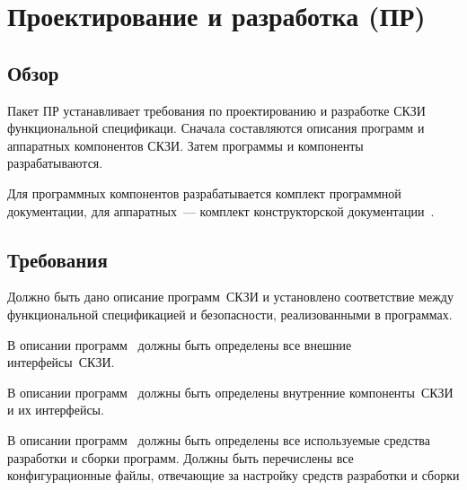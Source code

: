 \section{Проектирование и разработка (ПР)}\label{DI}

\subsection{Обзор}\label{DI.Intro}

Пакет ПР устанавливает требования по проектированию и разработке 
 СКЗИ
 функциональной спецификаци.
%
Сначала составляются описания программ и аппаратных компонентов СКЗИ.
Затем программы и компоненты разрабатываются.

Для программных компонентов разрабатывается комплект программной 
документации, для аппаратных~--- комплект конструкторской 
документации~.


\subsection{Требования}\label{DI.Reqs}

\label{R.DI.ProgSpec}
Должно быть дано описание программ~СКЗИ и установлено соответствие 
между функциональной спецификацией и  безопасности,
реализованными в программах.


\label{R.DI.HLD}
В описании программ~
должны быть определены все внешние интерфейсы~СКЗИ.

\label{R.DI.LLD}
В описании программ~
должны быть определены внутренние компоненты~СКЗИ и их интерфейсы.

\label{R.DI.Tools}
В описании программ~ должны быть определены все
используемые средства разработки и сборки программ. Должны быть перечислены 
все конфигурационные файлы, отвечающие за настройку средств разработки и 
сборки

